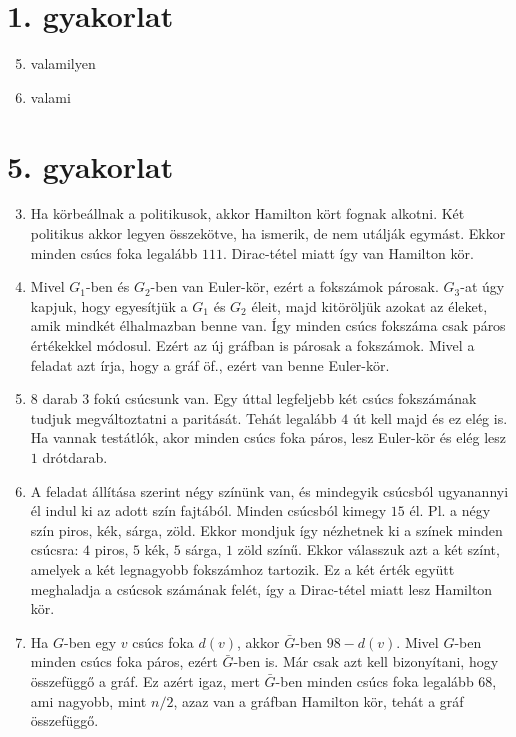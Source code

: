 \documentclass[a4paper, 12pt]{article}
\begin{document}
\section*{1. gyakorlat}
\begin{enumerate}
    \setcounter{enumi}{4}
    \item valamilyen
    
    \setcounter{enumi}{10}
    \item valami
\end{enumerate}

\section*{5. gyakorlat}
\begin{enumerate}
    \setcounter{enumi}{2}
    \item Ha körbeállnak a politikusok, akkor Hamilton kört fognak alkotni. Két politikus akkor legyen összekötve, ha ismerik, de nem utálják egymást. Ekkor minden csúcs foka legalább $111$. Dirac-tétel miatt így van Hamilton kör.
    \item Mivel $G_1$-ben és $G_2$-ben van Euler-kör, ezért a fokszámok párosak. $G_3$-at úgy kapjuk, hogy egyesítjük a $G_1$ és $G_2$ éleit, majd kitöröljük azokat az éleket, amik mindkét élhalmazban benne van. Így minden csúcs fokszáma csak páros értékekkel módosul. Ezért az új gráfban is párosak a fokszámok. Mivel a feladat azt írja, hogy a gráf öf., ezért van benne Euler-kör.
    \item $8$ darab $3$ fokú csúcsunk van. Egy úttal legfeljebb két csúcs fokszámának tudjuk megváltoztatni  a paritását. Tehát legalább $4$ út kell majd és ez elég is. Ha vannak testátlók, akor minden csúcs foka páros, lesz Euler-kör és elég lesz $1$ drótdarab.
    \item A feladat állítása szerint négy színünk van, és mindegyik csúcsból ugyanannyi él indul ki az adott szín fajtából. Minden csúcsból kimegy $15$ él. Pl. a négy szín piros, kék, sárga, zöld. Ekkor mondjuk így nézhetnek ki a színek minden csúcsra: $4$ piros, $5$ kék, $5$ sárga, $1$ zöld színű. Ekkor válasszuk azt a két színt, amelyek a két legnagyobb fokszámhoz tartozik. Ez a két érték együtt meghaladja a csúcsok számának felét, így a Dirac-tétel miatt lesz Hamilton kör.
    \item Ha $G$-ben egy $v$ csúcs foka $d(v)$, akkor $\bar{G}$-ben $98-d(v)$. Mivel $G$-ben minden csúcs foka páros, ezért $\bar{G}$-ben is. Már csak azt kell bizonyítani, hogy összefüggő a gráf. Ez azért igaz, mert $\bar{G}$-ben minden csúcs foka legalább $68$, ami nagyobb, mint $n/2$, azaz van a gráfban Hamilton kör, tehát a gráf összefüggő.

\end{enumerate}
\end{document}
